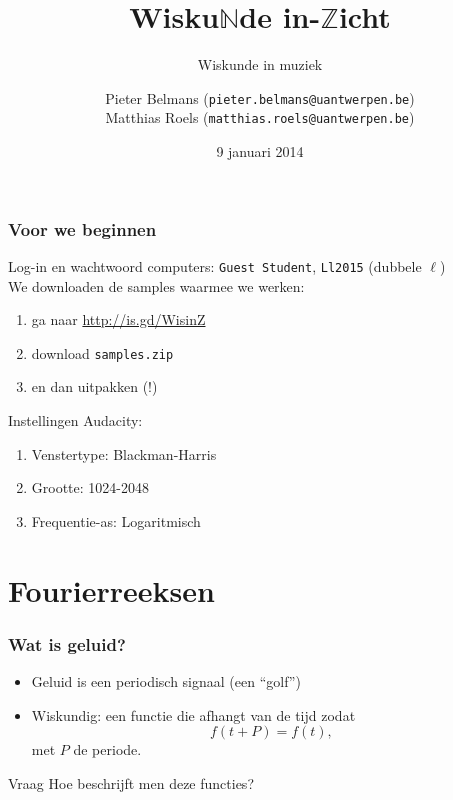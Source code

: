 \documentclass[compress, darktitle, framenumber, totalframenumber]{beamer}
\title{Wisku$\mathbb{N}$de in-$\mathbb{Z}$icht}
\subtitle{Wiskunde in muziek}
\author{Pieter Belmans (\texttt{pieter.belmans@uantwerpen.be}) \\ Matthias Roels (\texttt{matthias.roels@uantwerpen.be})}
\date{9 januari 2014}
\begin{document}
\begin{frame}
  \titlepage
\end{frame}

\begin{frame}
  \frametitle{Voor we beginnen}
  Log-in en wachtwoord computers: \texttt{Guest Student}, \texttt{Ll2015} (dubbele $\ell$) \\[.2cm] \noindent
  We downloaden de samples waarmee we werken:
  \begin{enumerate}
    \item ga naar \url{http://is.gd/WisinZ}
    \item download \texttt{samples.zip}
    \item en dan uitpakken (!)
  \end{enumerate}
Instellingen Audacity:
\begin{enumerate}
\item Venstertype: Blackman-Harris
\item Grootte: 1024-2048
\item Frequentie-as: Logaritmisch
\end{enumerate}  
  
\end{frame}

\section{Fourierreeksen}

\begin{frame}
\frametitle{Wat is geluid?}
\begin{itemize}
\item Geluid is een periodisch signaal (een ``golf'') 
\item Wiskundig: een functie die afhangt van de tijd zodat 
\begin{equation*}
f(t+P)=f(t),
\end{equation*}
met $P$ de periode.
\end{itemize}
\begin{block}{Vraag}
Hoe beschrijft men deze functies? 
\end{block}
\end{frame}
\end{document}

